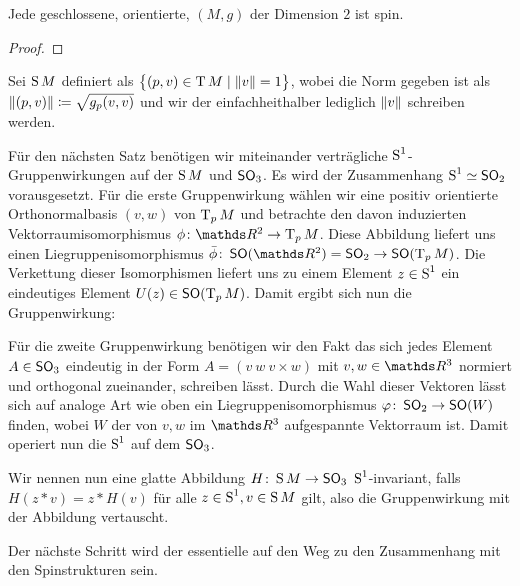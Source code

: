 \begin{Satz}
	Jede geschlossene, orientierte, \RMF  $(M,g)$ der Dimension $2$ ist spin.
	\begin{proof}
	\end{proof}
\end{Satz}

Sei $\S M$ definiert als $\set{(p,v) \in \T M}{ \norm{v} = 1}$, wobei
die Norm gegeben ist als $ \norm{(p,v)} \coloneqq \sqrt{g_p(v,v)} $
und wir der einfachheithalber lediglich $ \norm{v} $ schreiben werden.

Für den nächsten Satz benötigen wir miteinander verträgliche $ \S^1 $-Gruppenwirkungen auf der $ \S M $ und $ \so_3 $. Es wird der
Zusammenhang $ \S^1 \simeq \so_2 $ vorausgesetzt. Für die erste
Gruppenwirkung wählen wir eine positiv orientierte Orthonormalbasis
$ (v,w) $ von $ \tang{p}{M} $ und betrachte den davon induzierten
Vektorraumisomorphismus $ \abb{\phi}{\R^2}{\tang{p}{M}} $. Diese
Abbildung liefert uns einen Liegruppenisomorphismus $\abb{\bar{\phi}}{\so(\R^2) = \so_2}{\so(\tang{p}{M})} $. Die Verkettung
dieser Isomorphismen liefert uns zu einem Element $ z\in\S^1 $ ein
eindeutiges Element $ U(z)\in \so(\tang{p}{M}) $. Damit ergibt sich
nun die Gruppenwirkung:

Für die zweite Gruppenwirkung benötigen wir den Fakt das sich jedes
Element $ A \in \so_3$  eindeutig in der Form $ A=\left( v~w~v\times w\right) $ mit $ v,w \in \R^3$ normiert und orthogonal zueinander, 
schreiben lässt. Durch die Wahl dieser Vektoren lässt sich auf
analoge Art wie oben ein Liegruppenisomorphismus $ \abb{\varphi}{\so_2}{\so(W)} $ finden, wobei $ W $ der von $ v,w $ 
im $ \R^3 $ aufgespannte Vektorraum ist. Damit operiert nun die
$ \S^1 $ auf dem $ \so_3 $.

Wir nennen nun eine glatte Abbildung $ \abb{H}{\S M}{\so_3}~\S^1$-invariant, falls $ H(z*v) = z*H(v) $ für alle $ z \in \S^1, v\in \S M $ gilt, also die Gruppenwirkung mit der Abbildung vertauscht. 
 

Der nächste Schritt wird der essentielle auf den Weg zu den
Zusammenhang mit den Spinstrukturen sein.

